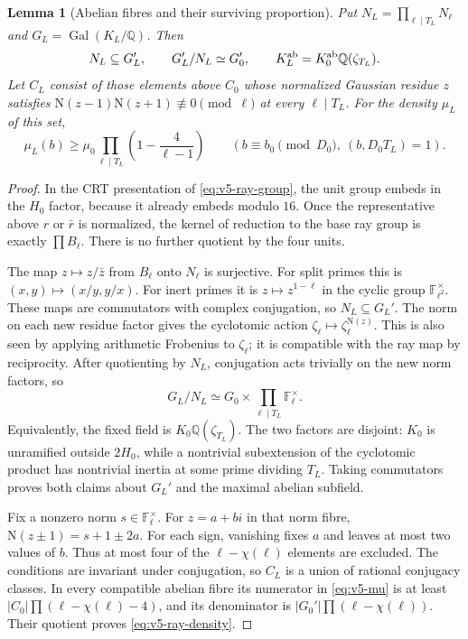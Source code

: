 \documentclass[11pt]{article}
\newtheorem{lemma}[theorem]{Lemma}
\theoremstyle{definition}
\theoremstyle{remark}
\begin{document}
\begin{lemma}[Abelian fibres and their surviving proportion]
\label{lem:v5-ray-fibres}
Put $N_L=\prod_{\ell\mid T_L}N_\ell$ and
$G_L=\operatorname{Gal}(K_L/\mathbb Q)$.
Then
\[
 N_L\subseteq G_L',\qquad
 G_L'/N_L\simeq G_0',\qquad
 K_L^{\rm ab}=K_0^{\rm ab}\mathbb Q(\zeta_{T_L}).
\]
Let $C_L$ consist of those elements above $C_0$ whose normalized Gaussian
residue $z$ satisfies $\mathrm N(z-1)\mathrm N(z+1)\not\equiv0\pmod\ell$
at every $\ell\mid T_L$. For the density $\mu_L$ of this set,
\begin{equation}\label{eq:v5-ray-density}
 \mu_L(b)\geq\mu_0
       \prod_{\ell\mid T_L}\left(1-\frac4{\ell-1}\right)
 \qquad (b\equiv b_0\pmod{D_0},\ (b,D_0T_L)=1).
\end{equation}
\end{lemma}
\begin{proof}
In the CRT presentation of \eqref{eq:v5-ray-group}, the unit group
embeds in the $H_0$ factor, because it already embeds modulo $16$.
Once the representative above $r$ or $\bar r$ is normalized, the kernel
of reduction to the base ray group is exactly $\prod B_\ell$.
There is no further quotient by the four units.

The map $z\mapsto z/\bar z$ from $B_\ell$ onto $N_\ell$ is surjective.
For split primes this is $(x,y)\mapsto(x/y,y/x)$.
For inert primes it is $z\mapsto z^{1-\ell}$ in the cyclic group
$\mathbb F_{\ell^2}^\times$.
These maps are commutators with complex conjugation, so $N_L\subseteq G_L'$.
The norm on each new residue factor gives the cyclotomic action
$\zeta_\ell\mapsto\zeta_\ell^{\mathrm N(z)}$.
This is also seen by applying arithmetic Frobenius to $\zeta_\ell$;
it is compatible with the ray map by reciprocity.
After quotienting by $N_L$, conjugation acts trivially on the new norm
factors, so
\[
 G_L/N_L\simeq G_0\times\prod_{\ell\mid T_L}\mathbb F_\ell^\times.
\]
Equivalently, the fixed field is $K_0\mathbb Q(\zeta_{T_L})$.
The two factors are disjoint: $K_0$ is unramified outside $2H_0$, while
a nontrivial subextension of the cyclotomic product has nontrivial inertia
at some prime dividing $T_L$. Taking commutators proves both claims about
$G_L'$ and the maximal abelian subfield.

Fix a nonzero norm $s\in\mathbb F_\ell^\times$.
For $z=a+bi$ in that norm fibre,
$\mathrm N(z\pm1)=s+1\pm2a$.
For each sign, vanishing fixes $a$ and leaves at most two values of $b$.
Thus at most four of the $\ell-\chi(\ell)$ elements are excluded.
The conditions are invariant under conjugation, so $C_L$ is a union of
rational conjugacy classes.
In every compatible abelian fibre its numerator in \eqref{eq:v5-mu} is
at least $|C_0|\prod(\ell-\chi(\ell)-4)$, and its denominator is
$|G_0'|\prod(\ell-\chi(\ell))$.
Their quotient proves \eqref{eq:v5-ray-density}.
\end{proof}
\end{document}
